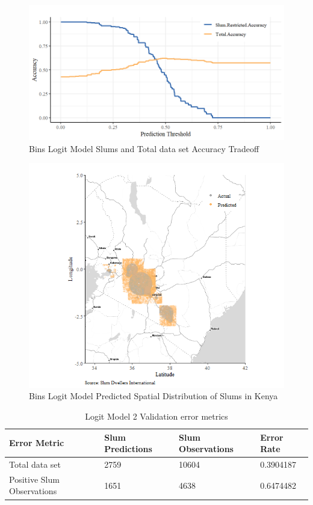 \begin{figure}
    \centering
    \includegraphics[scale = 0.8]{Graphics/Bins Slums and Total Dataset Accuracy Tradeoff.png}
    \caption{Bins Logit Model Slums and Total data set Accuracy Tradeoff}
    \label{fig:binsModelTradeoff}
\end{figure}



\begin{figure}
    \centering
    \includegraphics[scale = 0.6]{Graphics/Bins Predicted Spatial Distribution of Slums in Kenya.png}
    \caption{Bins Logit Model Predicted Spatial Distribution of Slums in Kenya}
    \label{fig:binsPredict}
\end{figure}

\begin{table}[ht]
\centering
\caption{Logit Model 2 Validation error metrics}
\begin{tabular}{llll}
  \hline \hline
  Error Metric &  Slum Predictions &  Slum Observations  & Error Rate \\ 
  \hline
Total data set & 2759 & 10604 & 0.3904187 \\ 
Positive Slum Observations & 1651 & 4638 & 0.6474482\\
   \hline
\end{tabular}
\end{table}
